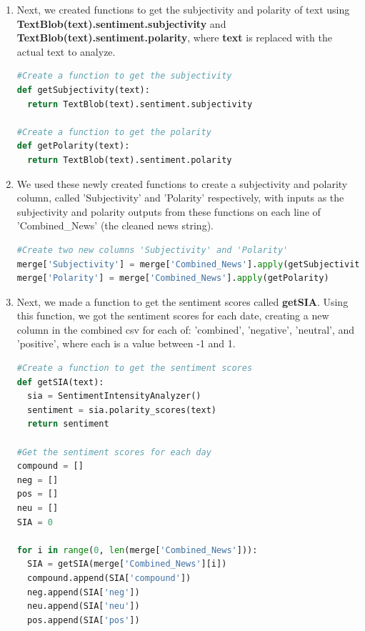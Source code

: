 \documentclass[10pt,twocolumn]{article}
\begin{document}
\begin{enumerate}
    \item Next, we created functions to get the subjectivity and polarity of text using \textbf{TextBlob(text).sentiment.subjectivity} and \textbf{TextBlob(text).sentiment.polarity}, where \textbf{text} is replaced with the actual text to analyze.

\begin{lstlisting}[language=Python, caption=Subjectivity and polarity functions]
#Create a function to get the subjectivity
def getSubjectivity(text):
  return TextBlob(text).sentiment.subjectivity

#Create a function to get the polarity
def getPolarity(text):
  return TextBlob(text).sentiment.polarity
\end{lstlisting}

    \item We used these newly created functions to create a subjectivity and polarity column, called 'Subjectivity' and 'Polarity' respectively, with inputs as the subjectivity and polarity outputs from these functions on each line of 'Combined\_News' (the cleaned news string).

\begin{lstlisting}[language=Python, caption=Get subjectivity and polarity]
#Create two new columns 'Subjectivity' and 'Polarity'
merge['Subjectivity'] = merge['Combined_News'].apply(getSubjectivity)
merge['Polarity'] = merge['Combined_News'].apply(getPolarity)
\end{lstlisting}

    \item Next, we made a function to get the sentiment scores called \textbf{getSIA}. Using this function, we got the sentiment scores for each date, creating a new column in the combined csv for each of: 'combined', 'negative', 'neutral', and 'positive', where each is a value between -1 and 1.

\begin{lstlisting}[language=Python, caption=Add sentiment scores]
#Create a function to get the sentiment scores
def getSIA(text):
  sia = SentimentIntensityAnalyzer()
  sentiment = sia.polarity_scores(text)
  return sentiment
  
#Get the sentiment scores for each day
compound = []
neg = []
pos = []
neu = []
SIA = 0

for i in range(0, len(merge['Combined_News'])):
  SIA = getSIA(merge['Combined_News'][i])
  compound.append(SIA['compound'])
  neg.append(SIA['neg'])
  neu.append(SIA['neu'])
  pos.append(SIA['pos'])


\end{lstlisting}
\end{enumerate}
\end{document}
